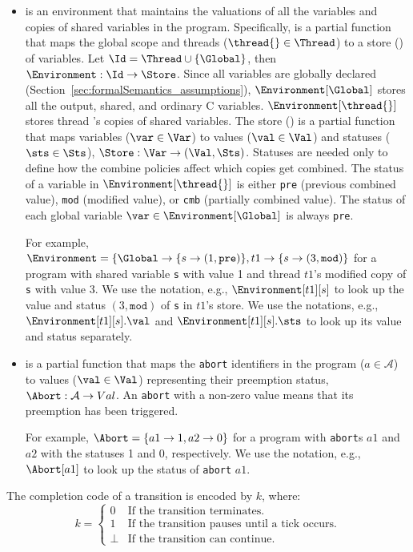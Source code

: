 \begin{itemize}
	\item \Environment{} is an environment that maintains the valuations of all the variables and 
		  copies of shared variables in the program. Specifically, \Environment{} is a partial
		  function that maps the global scope \Global{} and threads ($\thread{} \in \Thread$) to a 
		  store (\Store{}) of variables. Let $\Id = \Thread \cup \{\Global\}$, then 
		  $\Environment: \Id \to \Store$.
		  Since all variables are globally declared (Section~\ref{sec:formalSemantics_assumptions}), 
		  $\Environment[\Global]$ stores all the output, shared, and ordinary C variables. 
		  $\Environment[\thread{}]$ stores thread \thread{}'s copies of shared variables. 
		  The store (\Store{}) is a partial function that maps variables ($\var \in \Var$) to values ($\val \in \Val$) 
		  and statuses ($\sts \in \Sts$), $\Store: \Var \to (\Val, \Sts)$. Statuses are
		  needed only to define how the combine policies affect which copies get combined.
		  The status of a variable in $\Environment[\thread{}]$ is either \verb$pre$ (previous 
		  combined value), \verb$mod$ (modified value), or \verb$cmb$ (partially combined value). 
		  The status of each global variable $\var \in \Environment[\Global]$ is always \verb$pre$.
		
		  For example, $\Environment = \left \lbrace \Global \to \lbrace s \to (1, \mathtt{pre}) \rbrace, t1 \to \lbrace s \to (3, \mathtt{mod}) \right \rbrace$
		  for a program with shared variable \verb$s$ with value 1 and thread $t1$'s modified copy of
		  \verb$s$ with value 3. We use the
		  notation, e.g., $\Environment[t1][s]$ to look up the value and status $(3, \mathtt{mod})$ of \verb$s$ in $t1$'s store.
		  We use the notations, e.g.,  $\Environment[t1][s].\val$ and $\Environment[t1][s].\sts$
		  to look up its value and status separately.
		  
	\item \Abort{} is a partial function that maps the \verb$abort$ identifiers in the program 
		  ($a \in \mathcal{A}$) to values ($\val \in \Val$) representing their preemption status, 
		  $\Abort: \mathcal{A} \to Val$. An \verb$abort$ with a non-zero value means that its
		  preemption has been triggered. 
		  
		  For example, $\Abort = \lbrace a1 \to 1, a2 \to 0 \rbrace$ 
		  for a program with \verb$abort$s $a1$ and $a2$ with the statuses 1 and 0, respectively.
		  We use the notation, e.g., $\Abort[a1]$ to look up the status of \verb$abort$ $a1$.
\end{itemize}
The completion code of a transition is encoded by $k$, where:
\begin{equation*}
	k = \begin{cases}
		0		& \text{If the transition terminates.}								\\
		1		& \text{If the transition pauses until a tick occurs.}		\\
		\bot	& \text{If the transition can continue.}
	\end{cases}
\end{equation*}


